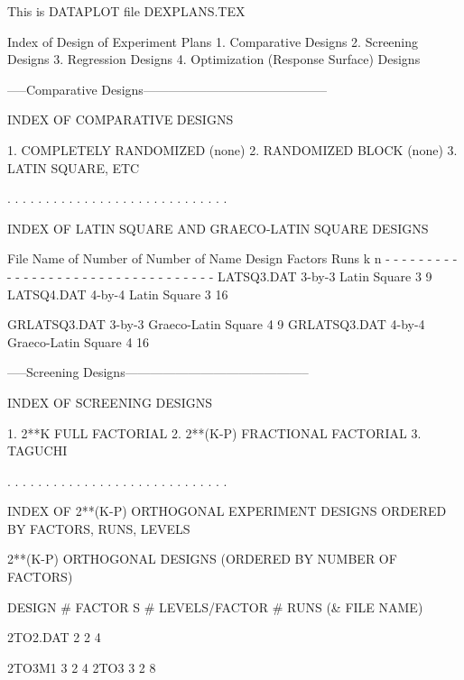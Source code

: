 This is DATAPLOT file DEXPLANS.TEX
 
 
           Index of Design of Experiment Plans
                          1. Comparative Designs
                          2. Screening Designs
                          3. Regression Designs
                          4. Optimization (Response Surface) Designs
 
 
 
-----Comparative Designs--------------------------------------------
 
               INDEX OF COMPARATIVE DESIGNS
 
                  1. COMPLETELY RANDOMIZED (none)
                  2. RANDOMIZED BLOCK (none)
                  3. LATIN SQUARE, ETC
 
. . . . . . . . . . . . . . . . . . . . . . . . . . . . .
 
INDEX OF LATIN SQUARE AND GRAECO-LATIN SQUARE DESIGNS
 
 
File             Name of                     Number of   Number of
Name             Design                       Factors      Runs
                                                 k           n
- - - - - - - - - - - - - - - - - - - - - - - - - - - - - - - - - -
LATSQ3.DAT       3-by-3 Latin Square             3           9
LATSQ4.DAT       4-by-4 Latin Square             3          16
 
GRLATSQ3.DAT     3-by-3 Graeco-Latin Square      4           9
GRLATSQ3.DAT     4-by-4 Graeco-Latin Square      4          16
 
 
 
-----Screening Designs--------------------------------------------
 
                INDEX OF SCREENING DESIGNS
 
                 1. 2**K FULL FACTORIAL
                 2. 2**(K-P) FRACTIONAL FACTORIAL
                 3. TAGUCHI
 
. . . . . . . . . . . . . . . . . . . . . . . . . . . . .
 
  INDEX OF 2**(K-P) ORTHOGONAL EXPERIMENT DESIGNS
         ORDERED BY FACTORS, RUNS, LEVELS
 
 
            2**(K-P) ORTHOGONAL DESIGNS
           (ORDERED BY NUMBER OF FACTORS)
 
  DESIGN     # FACTOR S    # LEVELS/FACTOR        # RUNS
(& FILE NAME)
 
 
  2TO2.DAT       2            2                      4
 
  2TO3M1         3            2                      4
  2TO3           3            2                      8
 

